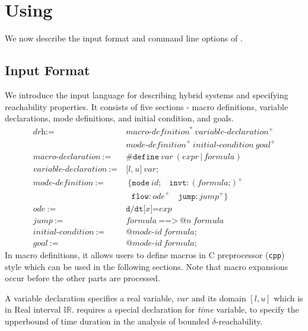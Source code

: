 \section{Using \dReach{}}\label{sec:using-dreach}
We now describe the input format and command line options of
\dReach{}.
\subsection{Input Format}\label{sec:input-format}
We introduce the input language \drh{} for describing hybrid
systems and specifying reachability properties. It consists of five
sections - macro definitions, variable declarations, mode definitions,
and initial condition, and goals.
\begin{align*}
  \textit{drh} := \ & \textit{macro-definition}^* \ \textit{variable-declaration}^+ \\
  & \textit{mode-definition}^+ \  \textit{initial-condition} \  \textit{goal}^+\\
  \textit{macro-declaration} \ := \ &  \texttt{\#define} \ \textit{var} \ (\textit{expr} \, | \, \textit{formula})\\
  \textit{variable-declaration} \ := \ &  \texttt{[}
  \textit{l}
  \texttt{,}
  \ \textit{u}
  \texttt{]}
  \ \textit{var}
  \texttt{;}\\
  \textit{mode-definition} \ := \ & \ \texttt{\{}
  \texttt{mode} \
  \textit{id}\texttt{;} \quad
  \texttt{invt}:(\textit{formula} \texttt{;})^+\\
  & \ \ \ \texttt{flow}:\textit{ode}^+ \quad
  \texttt{jump}:\textit{jump}^+ \texttt{\}}\\
  \textit{ode} \ := \ & \texttt{d/dt[}\textit{x}\texttt{]=}\textit{exp}\\
  \textit{jump} \ := \ & \textit{formula} \ \texttt{==>} \ \texttt{@}\textit{n} \ \textit{formula}\\
  \textit{initial-condition} \ := \ & \texttt{@}\textit{mode-id} \ \textit{formula}\texttt{;}\\
  \textit{goal}              \ := \ & \texttt{@}\textit{mode-id} \ \textit{formula}\texttt{;}
\end{align*}
In macro definitions, it allows users to define macros in C
preprocessor (\texttt{cpp}) style which can be used in the following
sections. Note that macro expansions occur before the other parts are
processed.

A variable declaration specifies a real variable, $var$ and its domain
$[l, u]$ which is in Real interval $\mathbb{IR}$. \drh{} requires a
special declaration for \textit{time} variable, to specify the
upperbound of time duration in the analysis of bounded
$\delta$-reachability.

